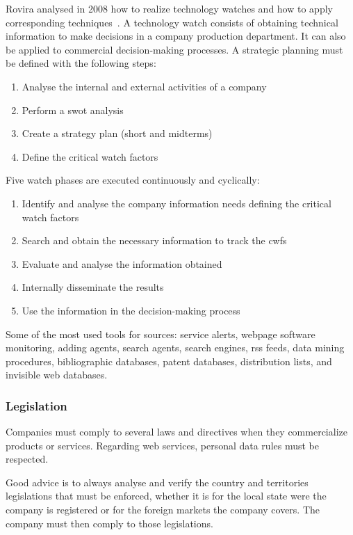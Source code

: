 Rovira analysed in 2008 how to realize technology watches and how to apply corresponding techniques~\cite{rovira_technology_2008}. A technology watch consists of obtaining technical information to make decisions in a company production department. It can also be applied to commercial decision-making processes. A strategic planning must be defined with the following steps:
\begin{enumerate}
	\item Analyse the internal and external activities of a company
	\item Perform a \gls{swot} analysis
	\item Create a strategy plan (short and midterms)
	\item Define the critical watch factors
\end{enumerate}
Five watch phases are executed continuously and cyclically:
\begin{enumerate}
	\item Identify and analyse the company information needs defining the critical watch factors
	\item Search and obtain the necessary information to track the \glspl{cwf}
	\item Evaluate and analyse the information obtained
	\item Internally disseminate the results
	\item Use the information in the decision-making process
\end{enumerate}
Some of the most used tools for sources: service alerts, webpage software monitoring, adding agents, search agents, search engines, \gls{rss} feeds, data mining procedures, bibliographic databases, patent databases, distribution lists, and invisible web databases. %

\subsubsection{Legislation}
\label{subsubsec:state_review_results_legislation}

Companies must comply to several laws and directives when they commercialize products or services. Regarding web services, personal data rules must be respected.

Good advice is to always analyse and verify the country and territories legislations that must be enforced, whether it is for the local state were the company is registered or for the foreign markets the company covers. The company must then comply to those legislations.

